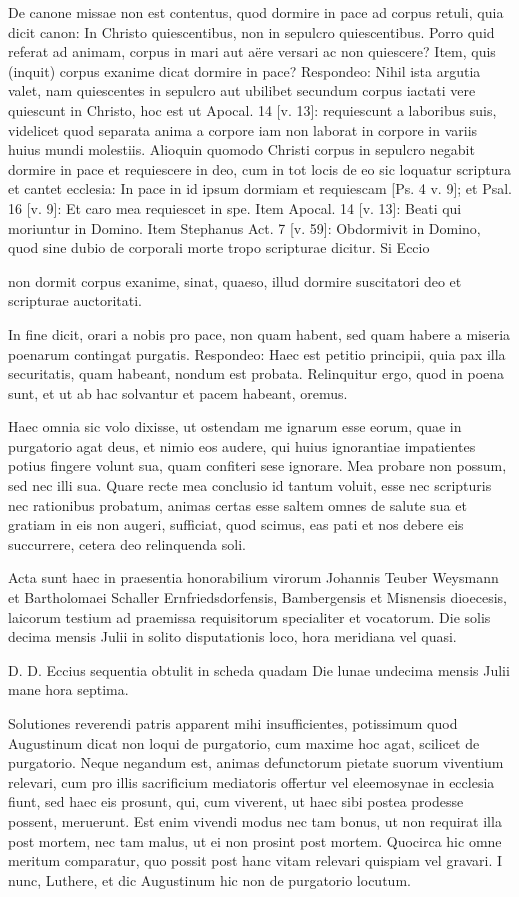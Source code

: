 De canone missae non est contentus, quod dormire in pace ad corpus retuli, quia dicit canon: In Christo quiescentibus, non in sepulcro quiescentibus. Porro quid referat ad animam, corpus in mari aut aëre versari ac non quiescere? Item, quis (inquit) corpus exanime dicat dormire in pace? Respondeo: Nihil ista argutia valet, nam quiescentes in sepulcro aut ubilibet secundum corpus iactati vere quiescunt in Christo, hoc est ut Apocal. 14 [v. 13]: requiescunt a laboribus suis, videlicet quod separata anima a corpore iam non laborat in corpore in variis huius mundi molestiis. Alioquin quomodo Christi corpus in sepulcro negabit dormire in pace et requiescere in deo, cum in tot locis de eo sic loquatur scriptura et cantet ecclesia: In pace in id ipsum dormiam et requiescam [Ps. 4 v. 9]; et Psal. 16 [v. 9]: Et caro mea requiescet in spe. Item Apocal. 14 [v. 13]: Beati qui moriuntur in Domino. Item Stephanus Act. 7 [v. 59]: Obdormivit in Domino, quod sine dubio de corporali morte tropo scripturae dicitur. Si Eccio

non dormit corpus exanime, sinat, quaeso, illud dormire suscitatori deo et scripturae auctoritati.

In fine dicit, orari a nobis pro pace, non quam habent, sed quam habere a miseria poenarum contingat purgatis. Respondeo: Haec est petitio principii, quia pax illa securitatis, quam habeant, nondum est probata. Relinquitur ergo, quod in poena sunt, et ut ab hac solvantur et pacem habeant, oremus.

Haec omnia sic volo dixisse, ut ostendam me ignarum esse eorum, quae in purgatorio agat deus, et nimio eos audere, qui huius ignorantiae impatientes potius fingere volunt sua, quam confiteri sese ignorare. Mea probare non possum, sed nec illi sua. Quare recte mea conclusio id tantum voluit, esse nec scripturis nec rationibus probatum, animas certas esse saltem omnes de salute sua et gratiam in eis non augeri, sufficiat, quod scimus, eas pati et nos debere eis succurrere, cetera deo relinquenda soli.

Acta sunt haec in praesentia honorabilium virorum Johannis Teuber Weysmann et Bartholomaei Schaller Ernfriedsdorfensis, Bambergensis et Misnensis dioecesis, laicorum testium ad praemissa requisitorum specialiter et vocatorum. Die solis decima mensis Julii in solito disputationis loco, hora meridiana vel quasi.

D. D. Eccius sequentia obtulit in scheda quadam Die lunae undecima mensis Julii mane hora septima.

Solutiones reverendi patris apparent mihi insufficientes, potissimum quod Augustinum dicat non loqui de purgatorio, cum maxime hoc agat, scilicet \marginpar{\small[343]} de purgatorio. Neque negandum est, animas defunctorum pietate suorum viventium relevari, cum pro illis sacrificium mediatoris offertur vel eleemosynae in ecclesia fiunt, sed haec eis prosunt, qui, cum viverent, ut haec sibi postea prodesse possent, meruerunt. Est enim vivendi modus nec tam bonus, ut non requirat illa post mortem, nec tam malus, ut ei non prosint post mortem. Quocirca hic omne meritum comparatur, quo possit post hanc vitam relevari quispiam vel gravari. I nunc, Luthere, et dic Augustinum hic non de purgatorio locutum.

